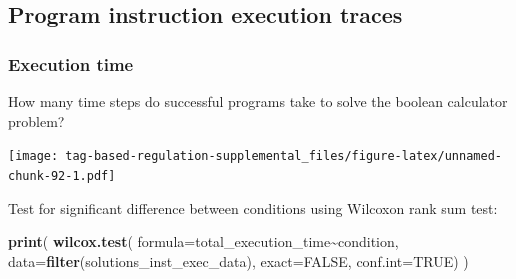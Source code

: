 \documentclass[
]{book}
\newenvironment{Shaded}{\begin{snugshade}}{\end{snugshade}}
\newcommand{\CharTok}[1]{\textcolor[rgb]{0.31,0.60,0.02}{#1}}
\newcommand{\CommentTok}[1]{\textcolor[rgb]{0.56,0.35,0.01}{\textit{#1}}}
\newcommand{\DataTypeTok}[1]{\textcolor[rgb]{0.13,0.29,0.53}{#1}}
\newcommand{\FloatTok}[1]{\textcolor[rgb]{0.00,0.00,0.81}{#1}}
\newcommand{\KeywordTok}[1]{\textcolor[rgb]{0.13,0.29,0.53}{\textbf{#1}}}
\newcommand{\NormalTok}[1]{#1}
\newcommand{\OperatorTok}[1]{\textcolor[rgb]{0.81,0.36,0.00}{\textbf{#1}}}
\newcommand{\OtherTok}[1]{\textcolor[rgb]{0.56,0.35,0.01}{#1}}
\newcommand{\StringTok}[1]{\textcolor[rgb]{0.31,0.60,0.02}{#1}}
\begin{document}
\hypertarget{program-instruction-execution-traces-3}{%
\subsection{Program instruction execution traces}\label{program-instruction-execution-traces-3}}

\hypertarget{execution-time-3}{%
\subsubsection{Execution time}\label{execution-time-3}}

How many time steps do successful programs take to solve the boolean calculator problem?

\begin{Shaded}
\end{Shaded}

\texttt{[image: tag-based-regulation-supplemental\_files/figure-latex/unnamed-chunk-92-1.pdf]}

Test for significant difference between conditions using Wilcoxon rank sum test:

\begin{Shaded}
\begin{Highlighting}[]
\KeywordTok{print}\NormalTok{(}
  \KeywordTok{wilcox.test}\NormalTok{(}
    \DataTypeTok{formula=}\NormalTok{total\_execution\_time}\OperatorTok{\textasciitilde{}}\NormalTok{condition,}
    \DataTypeTok{data=}\KeywordTok{filter}\NormalTok{(solutions\_inst\_exec\_data),}
    \DataTypeTok{exact=}\OtherTok{FALSE}\NormalTok{,}
    \DataTypeTok{conf.int=}\OtherTok{TRUE}\NormalTok{)}
\NormalTok{)}
\end{Highlighting}
\end{Shaded}
\end{document}
